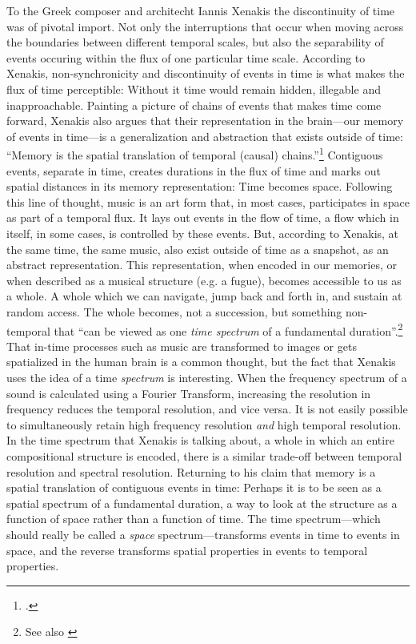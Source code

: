 To the Greek composer and architecht Iannis Xenakis the discontinuity of time was of pivotal import. Not only the interruptions that occur when moving across the boundaries between different temporal scales, but also the separability of events occuring within the flux of one particular time scale. According to Xenakis, non-synchronicity and discontinuity of events in time is what makes the flux of time perceptible: Without it time would remain hidden, illegable and inapproachable. Painting a picture of chains of events that makes time come forward, Xenakis also argues that their representation in the brain---our memory of events in time---is a generalization and abstraction that exists outside of time: ``Memory is the spatial translation of temporal (causal) chains.''\footcite[263]{xenakis71} 
Contiguous events, separate in time, creates durations in the flux of time and marks out spatial distances in its memory representation: Time becomes space. Following this line of thought, music is an art form that, in most cases, participates in space as part of a temporal flux. It lays out events in the flow of time, a flow which in itself, in some cases, is controlled by these events. But, according to Xenakis, at the same time, the same music, also exist outside of time as a snapshot, as an abstract representation.
This representation, when encoded in our memories, or when described as a musical structure (e.g. a fugue), becomes accessible to us as a whole. A whole which we can navigate, jump back and forth in, and sustain at random access. The whole becomes, not a succession, but something non-temporal that ``can be viewed as one \emph{time spectrum} of a fundamental duration''.\footnote{\cite[73, my italics.]{roads} See also \cite{stockhausen57}}
That in-time processes such as music are transformed to images or gets spatialized in the human brain is a common thought, but the fact that Xenakis uses the idea of a time \emph{spectrum} is interesting. When the frequency spectrum of a sound is calculated using a Fourier Transform, increasing the resolution in frequency reduces the temporal resolution, and vice versa. It is not easily possible to simultaneously retain high frequency resolution \emph{and} high temporal resolution. In the time spectrum that Xenakis is talking about, a whole in which an entire compositional structure is encoded, there is a similar trade-off between temporal resolution and spectral resolution. Returning to his claim that memory is a spatial translation of contiguous events in time: Perhaps it is to be seen as a spatial spectrum of a fundamental duration, a way to look at the structure as a function of space rather than a function of time. The time spectrum---which should really be called a \emph{space} spectrum---transforms events in time to events in space, and the reverse transforms spatial properties in events to temporal properties.

